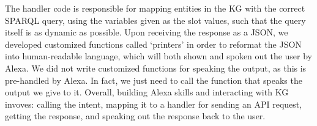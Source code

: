 \documentclass[10pt,journal,compsoc]{IEEEtran}
\begin{document}

The handler code is responsible for mapping entities in the KG with the correct SPARQL query, using the variables given as the slot values, such that the query itself is as dynamic as possible. Upon receiving the response as a JSON, we developed customized functions called `printers' in order to reformat the JSON into human-readable language, which will both shown and spoken out the user by Alexa. We did not write customized functions for speaking the output, as this is pre-handled by Alexa. In fact, we just need to call the function that speaks the output we give to it. 
Overall, building Alexa skills and interacting with KG invoves: calling the intent, mapping it to a handler for sending an API request, getting the response, and speaking out the response back to the user. %




\end{document}
